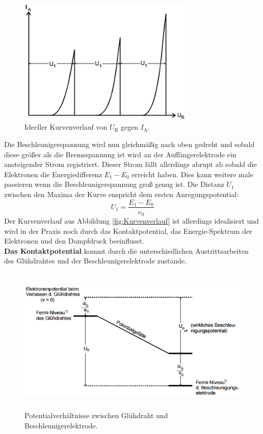 \begin{figure}[H]
	\centering
	\includegraphics[height=6cm]{picture/Kurvenverlauf}
	\caption{Ideeller Kurvenverlauf von $U_\text{B}$ gegen $I_\text{A}$. \cite[4]{sample}}
	\label{fig:Kurvenverlauf}
\end{figure}

Die Beschleunigerspannung wird nun gleichmäßig nach oben gedreht und sobald diese größer als die Bremsspannung ist wird an der Auffängerelektrode ein ansteigender Strom registriert. Dieser Strom fällt allerdings abrupt ab sobald die Elektronen die Energiedifferenz $E_1 - E_0$ erreicht haben. Dies kann weitere male passieren wenn die Beschleunigerspannung groß genug ist. Die Distanz $U_1$ zwischen den Maxima der Kurve enspricht dem ersten Anregungspotential:
\begin{equation}
	U_1 = \frac{E_1 - E_0}{e_0}
\end{equation}
Der Kurvenverlauf aus Abbildung \eqref{fig:Kurvenverlauf} ist allerdings idealisiert und wird in der Praxis noch durch das Kontaktpotential, das Energie-Spektrum der Elektronen und den Dampfdruck beeinflusst. \\
\textbf{Das Kontaktpotential} kommt durch die unterschiedlichen Austrittsarbeiten des Glühdrahtes und der Beschleunigerelektrode zustande.

\begin{figure}[H]
	\centering
	\includegraphics[height=7cm]{picture/Kontakt}
	\caption{Potentialverhältnisse zwischen Glühdraht und Beschleunigerelektrode. \cite[5]{sample}}
	\label{fig:Kontakt}
\end{figure}

